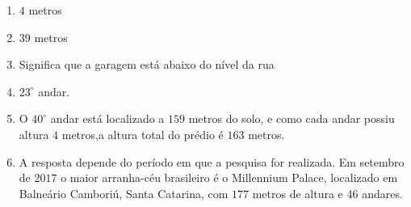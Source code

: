 \documentclass[10 pt,usenames,dvipsnames, oneside]{article}
\begin{document}
\ifdefined\prof
\begin{solucao}
\begin{enumerate}
\item {} 
$4$ metros
\item {} 
$39$ metros

\item {} 
Significa que a garagem está abaixo do nível da rua

\item {} 
$23^{\circ}$ andar.

\item {} 
O $40^{\circ}$ andar está localizado a $159$ metros do solo, e como cada andar possiu altura $4$ metros,a altura total do prédio é $163$ metros.

\item A resposta depende do período em que a pesquisa for realizada. Em setembro de $2017$ o maior arranha-céu brasileiro é o Millennium Palace, localizado em Balneário Camboriú, Santa Catarina, com $177$ metros de altura e $46$ andares.

\end{enumerate}
\end{solucao}
\fi
\end{document}
